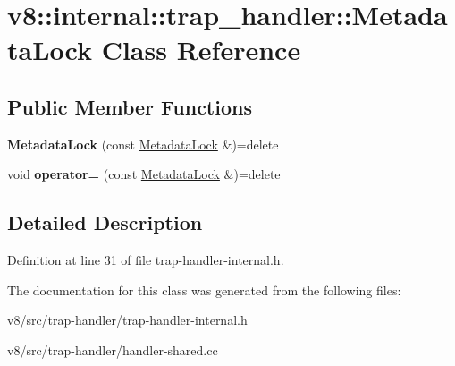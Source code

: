 \hypertarget{classv8_1_1internal_1_1trap__handler_1_1MetadataLock}{}\section{v8\+:\+:internal\+:\+:trap\+\_\+handler\+:\+:Metadata\+Lock Class Reference}
\label{classv8_1_1internal_1_1trap__handler_1_1MetadataLock}
\subsection*{Public Member Functions}
\begin{DoxyCompactItemize}
\item 
\mbox{\label{classv8_1_1internal_1_1trap__handler_1_1MetadataLock_ab0c0db657458b84ea00c83f838220664}} 
{\bfseries Metadata\+Lock} (const \mbox{\hyperlink{classv8_1_1internal_1_1trap__handler_1_1MetadataLock}{Metadata\+Lock}} \&)=delete
\item 
\mbox{\label{classv8_1_1internal_1_1trap__handler_1_1MetadataLock_aed8fb781c55c13ff50d8d284f9f88d7d}} 
void {\bfseries operator=} (const \mbox{\hyperlink{classv8_1_1internal_1_1trap__handler_1_1MetadataLock}{Metadata\+Lock}} \&)=delete
\end{DoxyCompactItemize}


\subsection{Detailed Description}


Definition at line 31 of file trap-\/handler-\/internal.\+h.



The documentation for this class was generated from the following files\+:\begin{DoxyCompactItemize}
\item 
v8/src/trap-\/handler/trap-\/handler-\/internal.\+h\item 
v8/src/trap-\/handler/handler-\/shared.\+cc\end{DoxyCompactItemize}
